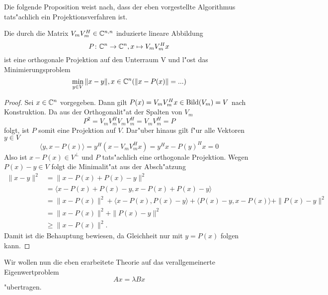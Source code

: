 Die folgende Proposition weist nach, dass der eben vorgestellte Algorithmus tats"achlich
ein Projektionsverfahren ist.

\begin{prop}\label{prop:projektor}
Die durch die Matrix $V_m V_m^H \in \mathbb{C}^{n,n}$ induzierte lineare Abbildung
\[
P\colon \mathbb{C}^n \to \mathbb{C}^n, x\mapsto V_m V_m^H x
\]
ist eine orthogonale Projektion auf den Unterraum V und l"ost das Minimierungsproblem
\[
\min_{y\in V}\|x-y\|, x\in\mathbb{C}^n (\|x-P(x)\| = ...)
\]
\end{prop}

\begin{proof}
Sei $x\in\mathbb{C}^n$ vorgegeben. Dann gilt $P(x) = V_m V_m^H x \in \operatorname{Bild}(V_m) = V$ nach Konstruktion.
Da aus der Orthogonalit"at der Spalten von $V_m$
\[
P^2 = V_m V_m^H V_m V_m^H = V_m V_m^H = P
\]
folgt, ist $P$ somit eine Projektion auf $V$. Dar"uber hinaus gilt f"ur alle
Vektoren $y\in V$
\[
\langle y, x-P(x)\rangle = y^H (x - V_m V_m^H x) = y^H x - P(y)^H x = 0
\]
Also ist $x-P(x) \in V^{\bot}$ und $P$ tats"achlich eine orthogonale Projektion.
Wegen $P(x)-y \in V$ folgt die Minimalit"at aus der Absch"atzung
\begin{align*}
\|x-y\|^2 &= \|x-P(x) + P(x)-y\|^2 \\
&= \langle x-P(x) + P(x)-y, x-P(x) + P(x)-y \rangle \\
&= \|x-P(x)\|^2 + \langle x-P(x), P(x)-y \rangle + \langle P(x)-y, x-P(x)\rangle + \|P(x)-y\|^2 \\
&= \|x - P(x)\|^2 + \| P(x)-y \|^2\\
&\ge \|x-P(x)\|^2.
\end{align*}
Damit ist die Behauptung bewiesen, da Gleichheit nur mit $y=P(x)$ folgen kann.
\end{proof}

Wir wollen nun die eben erarbeitete Theorie auf das verallgemeinerte Eigenwertproblem
\[
Ax = \lambda Bx
\]
"ubertragen.
